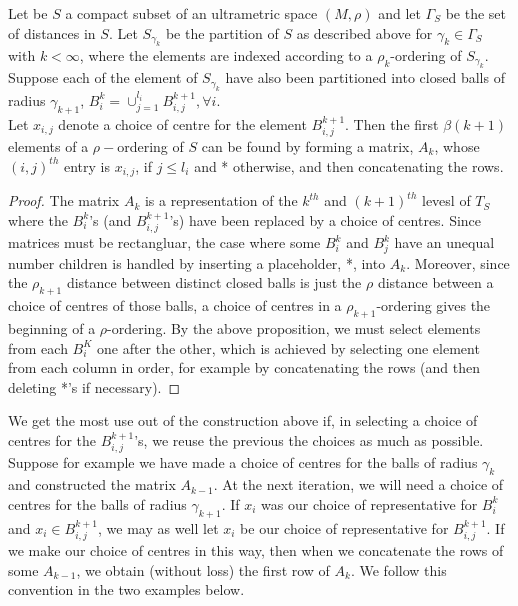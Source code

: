 \begin{proposition}
Let be $S$ a compact subset of an ultrametric space $(M, \rho)$ and let $\Gamma_S$ be the set of distances in $S$. Let $S_{\gamma_k}$ be the partition of $S$ as described above for $\gamma_k \in \Gamma_S$ with $k < \infty$, where the elements are indexed according to a $\rho_k$-ordering of $S_{\gamma_k}$. Suppose each of the element of $S_{\gamma_k}$ have also been partitioned into closed balls of radius $\gamma_{k+1}$, $B^k_i =\cup_{j=1}^{l_i} B^{k+1}_{i,j}, \forall i$.\\

Let $x_{i,j}$ denote a choice of centre for the element $B^{k+1}_{i,j}$. Then the first $\beta(k+1)$ elements of a $\rho-$ordering of $S$ can be found by forming a matrix, $A_k$, whose $(i,j)^{th}$ entry is $x_{i,j}$, if $j \leq l_i$ and * otherwise, and then concatenating the rows.
\end{proposition}


\begin{proof}
The matrix $A_k$ is a representation of the $k^{th}$ and $(k+1)^{th}$ levesl of $T_S$ where the $B^k_i$'s (and $B^{k+1}_{i,j}$'s) have been replaced by a choice of centres. Since matrices must be rectangluar, the case where some $B^k_i$ and $B^k_j$ have an unequal number children is handled by inserting a placeholder, *, into $A_k$.  Moreover, since the $\rho_{k+1}$ distance between distinct closed balls is just the $\rho$ distance between a choice of centres of those  balls, a choice of centres in a $\rho_{k+1}$-ordering gives the beginning of a $\rho$-ordering.  By the above proposition, we must select elements from each $B^K_i$ one after the other, which is achieved by selecting one element from each column in order, for example by concatenating the rows (and then deleting *'s if necessary). 
\end{proof}

We get the most use out of the construction above if, in selecting a choice of centres for the $B^{k+1}_{i,j}$'s, we reuse the previous the choices as much as possible. Suppose for example we have made a choice of centres for the balls of radius $\gamma_k$ and constructed the matrix $A_{k-1}$. At the next iteration, we will need a choice of centres for the balls of radius $\gamma_{k+1}$. If $x_i$ was our choice of representative for $B^k_i$ and $x_i \in B^{k+1}_{i,j}$, we may as well let $x_i$ be our choice of representative for $B^{k+1}_{i,j}$. If we make our choice of centres in this way, then when we concatenate the rows of some $A_{k-1}$, we obtain (without loss) the first row of $A_k$. We follow this convention in the two examples below.\\

